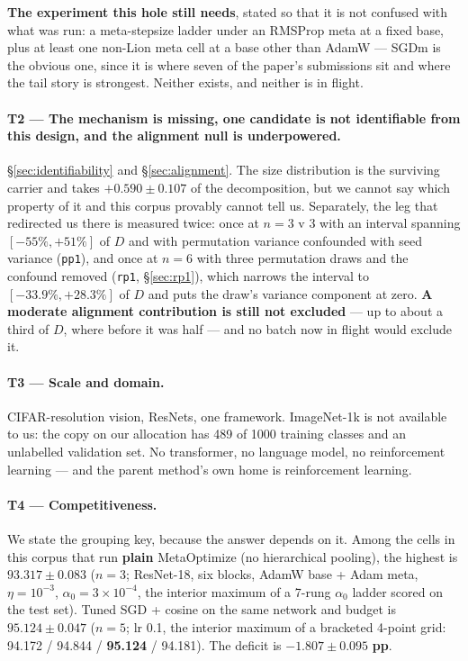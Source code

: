 \documentclass[10pt,letterpaper]{article}
\newcommand{\Dstat}{D}                         %
\newcommand{\arm}[1]{\texttt{#1}}
\begin{document}
\textbf{The experiment this hole still needs}, stated so that it is not confused with what was
run: a meta-stepsize ladder under an RMSProp meta at a fixed base, plus at least one non-Lion meta
cell at a base other than AdamW --- SGDm is the obvious one, since it is where seven of the
paper's submissions sit and where the tail story is strongest. Neither exists, and neither is in
flight.

\paragraph{T2 --- The mechanism is missing, one candidate is not identifiable from this design,
and the alignment null is underpowered.}
\S\ref{sec:identifiability} and \S\ref{sec:alignment}. The size distribution is the surviving
carrier and takes $+0.590 \pm 0.107$ of the decomposition, but we cannot say which property of it
and this corpus provably cannot tell us. Separately, the leg that redirected us there is measured
twice: once at $n = 3$ v $3$ with an interval spanning $[-55\%, +51\%]$ of $\Dstat$ and with
permutation variance confounded with seed variance (\arm{pp1}), and once at $n = 6$ with three
permutation draws and the confound removed (\arm{rp1}, \S\ref{sec:rp1}), which narrows the interval
to $[-33.9\%, +28.3\%]$ of $\Dstat$ and puts the draw's variance component at zero. \textbf{A
moderate alignment contribution is still not excluded} --- up to about a third of $\Dstat$, where
before it was half --- and no batch now in flight would exclude it.

\paragraph{T3 --- Scale and domain.}
CIFAR-resolution vision, ResNets, one framework. ImageNet-1k \citep{deng2009imagenet} is not
available to us: the copy on our allocation has 489 of 1000 training classes and an unlabelled
validation set. No transformer, no language model, no reinforcement learning --- and the parent
method's own home is reinforcement learning.

\paragraph{T4 --- Competitiveness.}
We state the grouping key, because the answer depends on it. Among the cells in this corpus that
run \textbf{plain} MetaOptimize (no hierarchical pooling), the highest is $93.317 \pm 0.083$
($n = 3$; ResNet-18, six blocks, AdamW base + Adam meta, $\eta = 10^{-3}$,
$\alpha_0 = 3\times10^{-4}$, the interior maximum of a 7-rung $\alpha_0$ ladder scored on the test
set). Tuned SGD + cosine \citep{loshchilov2017sgdr} on the same network and budget is
$95.124 \pm 0.047$ ($n = 5$; lr 0.1, the interior maximum of a bracketed 4-point grid:
94.172 / 94.844 / \textbf{95.124} / 94.181). The deficit is $\mathbf{-1.807 \pm 0.095}$ \textbf{pp}.
\end{document}
